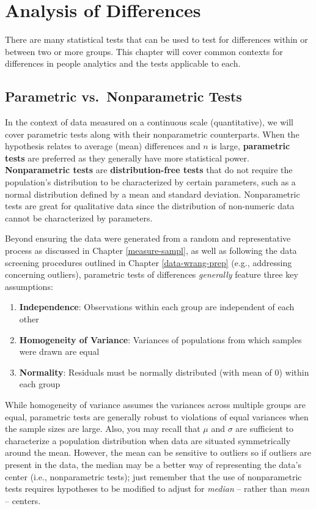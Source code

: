 \documentclass[]{book}
\providecommand{\tightlist}{%
  \setlength{\itemsep}{0pt}\setlength{\parskip}{0pt}}
\begin{document}
\hypertarget{aod}{%
\chapter{Analysis of Differences}\label{aod}}

There are many statistical tests that can be used to test for differences within or between two or more groups. This chapter will cover common contexts for differences in people analytics and the tests applicable to each.

\hypertarget{parametric-vs.nonparametric-tests}{%
\section{Parametric vs.~Nonparametric Tests}\label{parametric-vs.nonparametric-tests}}

In the context of data measured on a continuous scale (quantitative), we will cover parametric tests along with their nonparametric counterparts. When the hypothesis relates to average (mean) differences and \(n\) is large, \textbf{parametric tests} are preferred as they generally have more statistical power. \textbf{Nonparametric tests} are \textbf{distribution-free tests} that do not require the population's distribution to be characterized by certain parameters, such as a normal distribution defined by a mean and standard deviation. Nonparametric tests are great for qualitative data since the distribution of non-numeric data cannot be characterized by parameters.

Beyond ensuring the data were generated from a random and representative process as discussed in Chapter \ref{measure-sampl}, as well as following the data screening procedures outlined in Chapter \ref{data-wrang-prep} (e.g., addressing concerning outliers), parametric tests of differences \emph{generally} feature three key assumptions:

\begin{enumerate}
\def\labelenumi{\arabic{enumi}.}
\tightlist
\item
  \textbf{Independence}: Observations within each group are independent of each other
\item
  \textbf{Homogeneity of Variance}: Variances of populations from which samples were drawn are equal
\item
  \textbf{Normality}: Residuals must be normally distributed (with mean of 0) within each group
\end{enumerate}

While homogeneity of variance assumes the variances across multiple groups are equal, parametric tests are generally robust to violations of equal variances when the sample sizes are large. Also, you may recall that \(\mu\) and \(\sigma\) are sufficient to characterize a population distribution when data are situated symmetrically around the mean. However, the mean can be sensitive to outliers so if outliers are present in the data, the median may be a better way of representing the data's center (i.e., nonparametric tests); just remember that the use of nonparametric tests requires hypotheses to be modified to adjust for \emph{median} -- rather than \emph{mean} -- centers.
\end{document}

